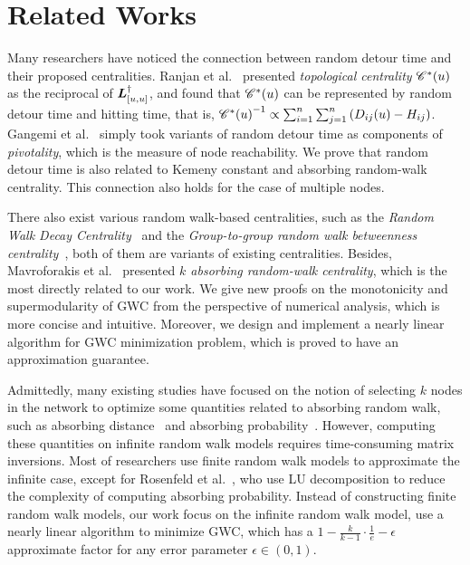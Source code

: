 \documentclass[10pt,twocolumn,twoside]{IEEEtran}
\begin{document}
\section{Related Works}

Many researchers have noticed the connection between random detour time and their proposed centralities.
Ranjan et al.~\cite{RaZh13} presented \textit{topological centrality} \(\mathscr{C}^*(u)\) as the reciprocal of \(\boldsymbol{L}^\dagger_{[u,u]}\), and found that \(\mathscr{C}^*(u)\) can be represented by random detour time and hitting time, that is, \({\mathscr{C}^*(u)}^{-1}\propto \sum_{i=1}^n\sum_{j=1}^n\left( D_{ij}(u)-H_{ij} \right)\).
Gangemi et al.~\cite{GaLePaGoLiZh15} simply took variants of random detour time as components of \textit{pivotality}, which is the measure of node reachability.
We prove that random detour time is also related to Kemeny constant and absorbing random-walk centrality.
This connection also holds for the case of multiple nodes.

There also exist various random walk-based centralities, such as the \textit{Random Walk Decay Centrality}~\cite{WaRaSk19} and the \textit{Group-to-group random walk betweenness centrality}~\cite{GiBaRa21}, both of them are variants of existing centralities.
Besides, Mavroforakis et al.~\cite{MaMaGi15} presented \textit{\(k\) absorbing random-walk centrality}, which is the most directly related to our work.
We give new proofs on the monotonicity and supermodularity of GWC from the perspective of numerical analysis, which is more concise and intuitive.
Moreover, we design and implement a nearly linear algorithm for GWC minimization problem, which is proved to have an approximation guarantee.

Admittedly, many existing studies have focused on the notion of selecting \(k\) nodes in the network to optimize some quantities related to absorbing random walk, such as absorbing distance~\cite{LiYuHuCh14,MoBaZhPe20} and absorbing probability~\cite{RoGl16}.
However, computing these quantities on infinite random walk models requires time-consuming matrix inversions.
Most of researchers use finite random walk models to approximate the infinite case, except for Rosenfeld et al.~\cite{RoGl16}, who use LU decomposition to reduce the complexity of computing absorbing probability.
Instead of constructing finite random walk models, our work focus on the infinite random walk model, use a nearly linear algorithm to minimize GWC, which has a \(1-\frac{k}{k-1}\cdot\frac{1}{e}-\epsilon\) approximate factor for any error parameter \(\epsilon\in(0,1)\).
\end{document}
